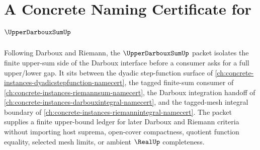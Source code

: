 \chapter{A Concrete Naming Certificate for $\UpperDarbouxSumUp$}
\label{ch:concrete-instances-upper-darboux-sum-namecert}

Following Darboux and Riemann, the $\UpperDarbouxSumUp$ packet isolates the finite upper-sum side of the Darboux interface before a consumer asks for a full upper/lower gap. It sits between the dyadic step-function surface of \autoref{ch:concrete-instances-dyadicstepfunction-namecert}, the tagged finite-sum consumer of \autoref{ch:concrete-instances-riemannsum-namecert}, the Darboux integration handoff of \autoref{ch:concrete-instances-darbouxintegral-namecert}, and the tagged-mesh integral boundary of \autoref{ch:concrete-instances-riemannintegral-namecert}. The packet supplies a finite upper-bound ledger for later Darboux and Riemann criteria without importing host suprema, open-cover compactness, quotient function equality, selected mesh limits, or ambient $\RealUp$ completeness.

